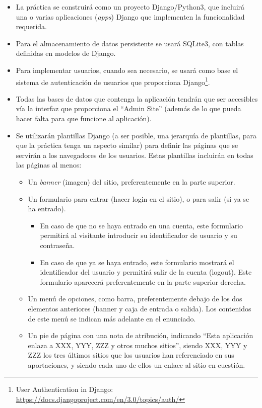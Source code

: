 \begin{itemize}

\item La práctica se construirá como un proyecto Django/Python3, que incluirá una o varias aplicaciones (\emph{apps}) Django que implementen la funcionalidad requerida.

\item Para el almacenamiento de datos persistente se usará SQLite3, con tablas definidas en modelos de Django.

\item Para implementar usuarios, cuando sea necesario, se usará como base el sistema de autenticación de usuarios que proporciona Django\footnote{User Authentication in Django:\\ \url{https://docs.djangoproject.com/en/3.0/topics/auth/}}.

\item Todas las bases de datos que contenga la aplicación tendrán que ser accesibles vía la interfaz que proporciona el ``Admin Site'' (además de lo que pueda hacer falta para que funcione al aplicación).

\item Se utilizarán plantillas Django (a ser posible, una jerarquía de plantillas, para que la práctica tenga un aspecto similar) para definir las páginas que se servirán a los navegadores de los usuarios. Estas plantillas incluirán en todas las páginas al menos:

  \begin{itemize}
  \item Un \emph{banner} (imagen) del sitio, preferentemente en la parte superior.
  \item Un formulario para entrar (hacer login en el sitio), o para salir (si ya se ha entrado).
    \begin{itemize}
    \item En caso de que no se haya entrado en una cuenta, este formulario permitirá al visitante introducir su identificador de usuario y su contraseña.
    \item En caso de que ya se haya entrado, este formulario mostrará el identificador del usuario y permitirá salir de la cuenta (logout). Este formulario aparecerá preferentemente en la parte superior derecha.
    \end{itemize}
  \item Un menú de opciones, como barra, preferentemente debajo de los dos elementos anteriores (banner y caja de entrada o salida). Los contenidos de este menú se indican más adelante en el enunciado.
  \item Un pie de página con una nota de atribución, indicando ``Esta aplicación enlaza a XXX, YYY, ZZZ y otros muchos sitios'', siendo XXX, YYY y ZZZ los tres últimos sitios que los usuarios han referenciado en sus aportaciones, y siendo cada uno de ellos un enlace al sitio en cuestión.
  \end{itemize}


\end{itemize}
